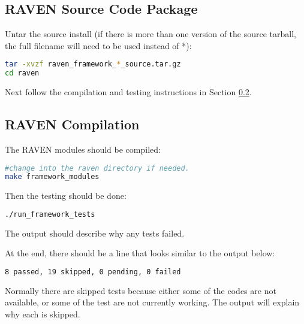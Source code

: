 

\subsection{RAVEN Source Code Package}
\label{raven_source_package}

Untar the source install (if there is more than one version of the
source tarball, the full filename will need to be used instead of *):

\begin{lstlisting}[language=bash]
tar -xvzf raven_framework_*_source.tar.gz
cd raven
\end{lstlisting}

Next follow the compilation and testing instructions in Section
\ref{raven_compilation}.

\subsection{RAVEN Compilation}
\label{raven_compilation}

The RAVEN modules should be compiled:

\begin{lstlisting}[language=bash]
#change into the raven directory if needed.
make framework_modules
\end{lstlisting}

Then the testing should be done:

\begin{lstlisting}[language=bash]
./run_framework_tests
\end{lstlisting}

The output should describe why any tests failed.

At the end, there should be a line that looks similar to the output below:
\begin{lstlisting}[language=bash]
8 passed, 19 skipped, 0 pending, 0 failed
\end{lstlisting}

Normally there are skipped tests because either some of the codes are
not available, or some of the test are not currently working.  The
output will explain why each is skipped.

